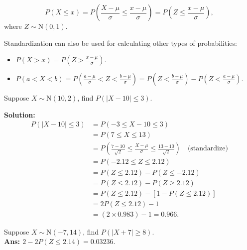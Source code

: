 \pagebreak

\begin{theorem}
    \[
        P(X \leq x) = P(\frac{X - \mu}{\sigma} \leq \frac{x - \mu}{\sigma}) = P(Z \leq \frac{x - \mu}{\sigma}),
    \]
    where $Z \sim \text{N}(0,1)$.
\end{theorem}

\begin{remark}
    Standardization can also be used for calculating other types of probabilities:
    \begin{itemize}
        \item $P(X > x) = P(Z > \frac{x - \mu}{\sigma})$.
        \item $P(a < X < b) = P(\frac{a - \mu}{\sigma} < Z < \frac{b - \mu}{\sigma}) = P(Z < \frac{b - \mu}{\sigma}) - P(Z < \frac{a - \mu}{\sigma})$. \\
    \end{itemize}
\end{remark}

\begin{example}
    Suppose $X \sim \text{N}(10,2)$, find $P(|X-10| \leq 3)$.

    \textbf{Solution:} 
    \begin{align*}
        P(|X-10| \leq 3) &= P(-3 \leq X - 10 \leq 3) \\
        &= P(7 \leq X \leq 13) \\
        &= P(\frac{7 - 10}{\sqrt{2}} \leq \frac{X - \mu}{\sigma} \leq \frac{13 - 10}{\sqrt{2}}) \quad \text{(standardize)} \\
        &= P(-2.12 \leq Z \leq 2.12) \\
        &= P(Z \leq 2.12) - P(Z \leq -2.12) \\
        &= P(Z \leq 2.12) - P(Z \geq 2.12) \\
        &= P(Z \leq 2.12) - \left[ 1 - P(Z \leq 2.12) \right] \\
        &= 2P(Z \leq 2.12) - 1 \\
        &= (2 \times 0.983) - 1 = 0.966.
    \end{align*}
\end{example}

\begin{example}
    Suppose $X \sim \text{N}(-7,14)$, find $P(|X+7| \geq 8)$. \\
    \textbf{Ans: $2 - 2P(Z \leq 2.14) = 0.03236$}.
\end{example}

